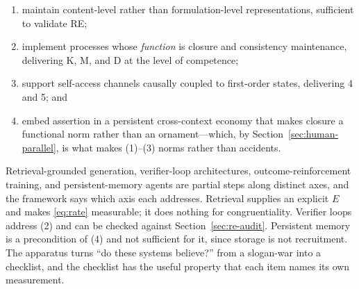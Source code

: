 \begin{enumerate}
  \item maintain content-level rather than formulation-level representations,
        sufficient to validate RE;
  \item implement processes whose \emph{function} is closure and consistency
        maintenance, delivering K, M, and D at the level of competence;
  \item support self-access channels causally coupled to first-order states,
        delivering 4 and 5; and
  \item embed assertion in a persistent cross-context economy that makes closure
        a functional norm rather than an ornament---which, by
        Section~\ref{sec:human-parallel}, is what makes (1)--(3) norms rather than
        accidents.
\end{enumerate}

Retrieval-grounded generation, verifier-loop architectures, outcome-reinforcement
training, and persistent-memory agents are partial steps along distinct axes, and
the framework says which axis each addresses. Retrieval supplies an explicit $E$
and makes \eqref{eq:rate} measurable; it does nothing for congruentiality.
Verifier loops address (2) and can be checked against
Section~\ref{sec:re-audit}. Persistent memory is a precondition of (4) and not
sufficient for it, since storage is not recruitment. The apparatus turns ``do
these systems believe?'' from a slogan-war into a checklist, and the checklist has
the useful property that each item names its own measurement.
